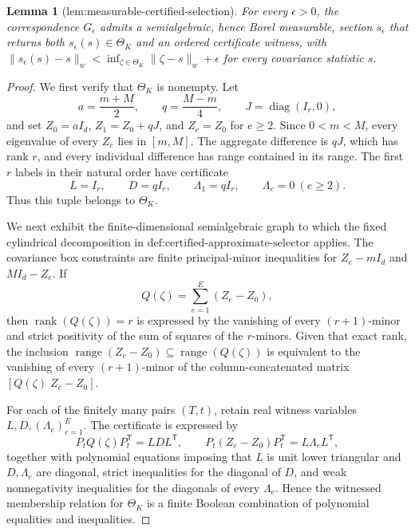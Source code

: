 \documentclass{article}
\newtheorem{lemma}{Lemma}
\begin{document}
\begin{lemma}[lem:measurable-certified-selection]\label{lem:measurable-certified-selection}
For every \(\epsilon>0\), the correspondence \(G_{\epsilon}\) admits a semialgebraic, hence Borel measurable, section \(s_{\epsilon}\) that returns both \(s_{\epsilon}(s)\in\Theta_K\) and an ordered certificate witness, with \(\lVert s_{\epsilon}(s)-s\rVert_w<\inf_{\zeta\in\Theta_K}\lVert\zeta-s\rVert_w+\epsilon\) for every covariance statistic \(s\).
\end{lemma}
\begin{proof}
We first verify that \(\Theta_K\) is nonempty.  Let
\[
 a=\frac{m+M}{2},\qquad q=\frac{M-m}{4},\qquad
 J=\operatorname{diag}(I_r,0),
\]
and set \(Z_0=aI_d\), \(Z_1=Z_0+qJ\), and \(Z_e=Z_0\) for \(e\ge2\).  Since \(0<m<M\), every eigenvalue of every \(Z_e\) lies in \([m,M]\).  The aggregate difference is \(qJ\), which has rank \(r\), and every individual difference has range contained in its range.  The first \(r\) labels in their natural order have certificate
\[
 L=I_r,\qquad D=qI_r,\qquad
 \Lambda_1=qI_r,\qquad \Lambda_e=0\ (e\ge2).
\]
Thus this tuple belongs to \(\Theta_K\).

We next exhibit the finite-dimensional semialgebraic graph to which the fixed cylindrical decomposition in \(\text{def:certified-approximate-selector}\) applies.  The covariance box constraints are finite principal-minor inequalities for \(Z_e-mI_d\) and \(MI_d-Z_e\).  If
\[
 Q(\zeta)=\sum_{e=1}^E(Z_e-Z_0),
\]
then \(\operatorname{rank}(Q(\zeta))=r\) is expressed by the vanishing of every \((r+1)\)-minor and strict positivity of the sum of squares of the \(r\)-minors.  Given that exact rank, the inclusion
\(\operatorname{range}(Z_e-Z_0)\subseteq\operatorname{range}(Q(\zeta))\) is equivalent to the vanishing of every \((r+1)\)-minor of the column-concatenated matrix \([Q(\zeta)\; Z_e-Z_0]\).

For each of the finitely many pairs \((T,t)\), retain real witness variables \(L,D,(\Lambda_e)_{e=1}^E\).  The certificate is expressed by
\[
 P_tQ(\zeta)P_t^{\mathsf T}=LDL^{\mathsf T},
 \qquad
 P_t(Z_e-Z_0)P_t^{\mathsf T}=L\Lambda_eL^{\mathsf T}, \tag{17}
\]
together with polynomial equations imposing that \(L\) is unit lower triangular and \(D,\Lambda_e\) are diagonal, strict inequalities for the diagonal of \(D\), and weak nonnegativity inequalities for the diagonals of every \(\Lambda_e\).  Hence the witnessed membership relation for \(\Theta_K\) is a finite Boolean combination of polynomial equalities and inequalities.


\end{proof}
\end{document}
